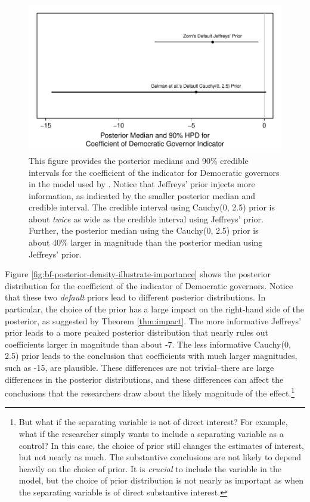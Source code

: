 \documentclass[12pt]{article}
\begin{document}
\begin{figure}[H]
\begin{center}
\includegraphics[scale = .8]{figs/br-coef-illustrate-importance.pdf}
\caption{This figure provides the posterior medians and 90\% credible intervals for the coefficient of the indicator for Democratic governors in the model used by \cite{BarrilleauxRainey2014}. 
Notice that Jeffreys' prior injects more information, as indicated by the smaller posterior median and credible interval. 
The credible interval using Cauchy(0, 2.5) prior is about \emph{twice} as wide as the credible interval using Jeffreys' prior. 
Further, the posterior median using the Cauchy(0, 2.5) prior is about 40\% larger in magnitude than the posterior median using Jeffreys' prior.}\label{fig:br-coef-illustrate-importance}
\end{center}
\end{figure}

Figure \ref{fig:bf-posterior-density-illustrate-importance} shows the posterior distribution for the coefficient of the indicator of Democratic governors. 
Notice that these two \emph{default} priors lead to different posterior distributions. 
In particular, the choice of the prior has a large impact on the right-hand side of the posterior, as suggested by Theorem \ref{thm:impact}. 
The more informative Jeffreys' prior leads to a more peaked posterior distribution that nearly rules out coefficients larger in magnitude than about -7. 
The less informative Cauchy(0, 2.5) prior leads to the conclusion that coefficients with much larger magnitudes, such as -15, are plausible. 
These differences are not trivial--there are large differences in the posterior distributions, and these differences can affect the conclusions that the researchers draw about the likely magnitude of the effect.\footnote{
But what if the separating variable is not of direct interest? 
For example, what if the researcher simply wants to include a separating variable as a control? 
In this case, the choice of prior still changes the estimates of interest, but not nearly as much. 
The substantive conclusions are not likely to depend heavily on the choice of prior. 
It is \textit{crucial} \citep{Zorn2005} to include the variable in the model, but the choice of prior distribution is not nearly as important as when the separating variable is of direct substantive interest.}
\end{document}
